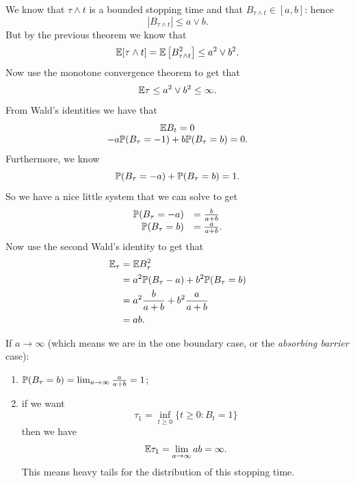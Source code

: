 \documentclass[12pt]{report}
\begin{document}
\begin{fancyproof}
	We know that $\tau\wedge t$ is a bounded stopping time and that $B_{\tau\wedge t}\in[a,b]$: hence
	\begin{equation*}
		|B_{\tau\wedge t}|\leq a\vee b.
	\end{equation*}
	But by the previous theorem we know that 
	\begin{equation*}
		\mathbb{E}[\tau\wedge t]=\mathbb{E}\left[B^{2}_{\tau\wedge t}\right]\leq a^{2}\vee b^{2}.
	\end{equation*}
	Now use the monotone convergence theorem to get that
	\begin{equation*}
		\mathbb{E}\tau\leq a^{2}\vee b^{2}\leq\infty.
	\end{equation*}
	From Wald's identities we have that 
	\begin{equation*}
		\begin{array}{c}
			\mathbb{E} B_{t}=0\\
			-a\mathbb{P}(B_{\tau}=-1)+b\mathbb{P}(B_{\tau}=b)=0.
		\end{array}
	\end{equation*}
	Furthermore, we know
	\begin{equation*}
		\mathbb{P}(B_{\tau}=-a)+\mathbb{P}(B_{\tau}=b)=1.
	\end{equation*}
	So we have a nice little system that we can solve to get
			\begin{equation*}
		\begin{array}{rl}
			\mathbb{P}(B_{\tau}=-a)&=\frac{b}{a+b}\\
			\mathbb{P}(B_{\tau}=b)&=\frac{a}{a+b}.
		\end{array}
	\end{equation*}
	Now use the second Wald's identity to get that 
	\begin{align*}
		\mathbb{E}_{\tau}&=\mathbb{E} B^{2}_{\tau}\\
		&=a^{2}\mathbb{P}(B_{\tau}-a)+b^{2}\mathbb{P}(B_{\tau}=b)\\
		&=a^{2}\frac{b}{a+b}+b^{2}\frac{a}{a+b}\\
		&=ab.
	\end{align*}
\end{fancyproof}
\begin{remark}
	If $a\to\infty$ (which means we are in the one boundary case, or the \textit{absorbing barrier} case):
	\begin{enumerate}
		\item $\mathbb{P}(B_{\tau}=b)=\lim_{a\to\infty}\frac{a}{a+b}=1$;
		\item if we want
		\begin{equation*}
			\tau_{1}=\inf_{t\geq 0}\{t\geq0:B_{t}=1\}
		\end{equation*}
		then we have 
		\begin{equation*}
			\mathbb{E}\tau_{1}=\lim_{a\to\infty}ab=\infty.
		\end{equation*}
		This means heavy tails for the distribution of this stopping time.
	\end{enumerate}
\end{remark}
\end{document}
